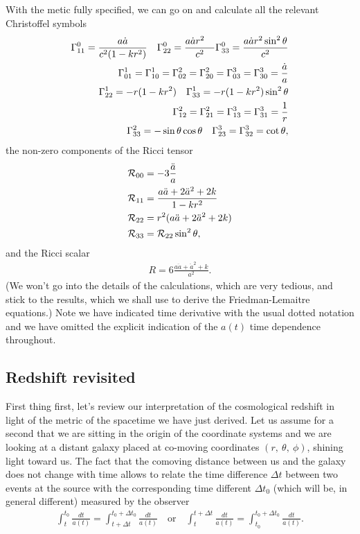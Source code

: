 With the metic fully specified, we can go on and calculate all the relevant
Christoffel symbols
\begin{align*}
  \Gamma^{0}_{11} = \frac{a\dot{a}}{c^2(1 - kr^2)}\quad
  \Gamma^{0}_{22} = \frac{a\dot{a}r^2\quad}{c^2}
  \Gamma^{0}_{33} = \frac{a\dot{a}r^2 \sin^2\theta}{c^2}\\
  \Gamma^{1}_{01} = \Gamma^{1}_{10} = \Gamma^{2}_{02} = \Gamma^{2}_{20} =
  \Gamma^{3}_{03} = \Gamma^{3}_{30} = \frac{\dot{a}}{a}\\
  \Gamma^{1}_{22} = -r(1 - kr^2)\quad
  \Gamma^{1}_{33} = -r(1 - kr^2)\sin^2\theta\\
  \Gamma^{2}_{12} = \Gamma^{2}_{21} = \Gamma^{3}_{13} = \Gamma^{3}_{31} = \frac{1}{r}\\
  \Gamma^{2}_{33} = - \sin\theta \cos\theta\quad
  \Gamma^{3}_{23} = \Gamma^{3}_{32} = \cot\theta,
\end{align*}
the non-zero components of the Ricci tensor
\begin{align*}
  \mathcal{R}_{00} &= -3\frac{\ddot{a}}{a}\\
  \mathcal{R}_{11} &= \frac{a\ddot{a} + 2\ddot{a}^2 + 2k}{1 - kr^2}\\
  \mathcal{R}_{22} &= r^2(a\ddot{a} + 2\ddot{a}^2 + 2k)\\
  \mathcal{R}_{33} &= \mathcal{R}_{22}\sin^2\theta,
\end{align*}
and the Ricci scalar
\begin{align*}
  R = 6\frac{a\ddot{a} + \ddot{a}^2 + k}{a^2}.
\end{align*}
(We won't go into the details of the calculations, which are very tedious, and stick
to the results, which we shall use to derive the Friedman-Lemaitre equations.) Note
we have indicated time derivative with the usual dotted notation and we have omitted
the explicit indication of the $a(t)$ time dependence throughout.



\subsection{Redshift revisited}

First thing first, let's review our interpretation of the cosmological redshift in
light of the metric of the spacetime we have just derived. Let us assume for a second
that we are sitting in the origin of the coordinate systems and we are looking at a
distant galaxy placed at co-moving coordinates $(r,~\theta,~\phi)$, shining light
toward us. The fact that the comoving distance between us and the galaxy does not
change with time allows to relate the time difference $\Delta t$ between two events
at the source with the corresponding time different $\Delta t_0$ (which will be,
in general different) measured by the observer
\begin{align*}
  \int_{t}^{t_0} \frac{dt}{a(t)} = \int_{t + \Delta t}^{t_0 + \Delta t_0} \frac{dt}{a(t)}
  \quad\text{or}\quad
  \int_{t}^{t + \Delta t} \frac{dt}{a(t)} = \int_{t_0}^{t_0 + \Delta t_0} \frac{dt}{a(t)}.
\end{align*}

